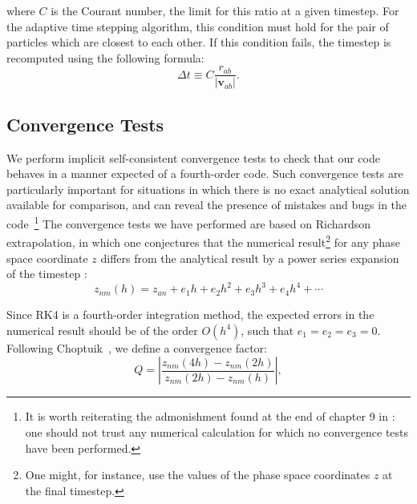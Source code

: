 \documentclass[aps,onecolumn,notitlepage,eqsecnum,nofootinbib,floatfix,superscriptaddress]{revtex4-1}
\begin{document}
\noindent where $C$ is the Courant number, the limit for this ratio at a given
timestep. For the adaptive time stepping algorithm, this condition must
hold for the pair of particles which are closest to each other. If
this condition fails, the timestep is recomputed using the following formula:
\begin{equation} \label{AdaptiveTimestepFormula}
  \Delta t \equiv C \frac{r_{ab}}{|\mathbf{v}_{ab}|}.
\end{equation}

%
%
\subsection{Convergence Tests}
\label{sec_convergence}
We perform implicit self-consistent convergence tests to check that our code behaves in a manner expected of a fourth-order code. Such convergence tests are particularly important for situations in which there is no exact analytical solution available for comparison, and can reveal the presence of mistakes and bugs in the code~\cite{BaumgarteShapiro}\footnote{It is worth reiterating the admonishment found at the end of chapter 9 in \cite{Alcubierre}: one should not trust any numerical calculation for which no convergence tests have been performed.} The convergence tests we have performed are based on Richardson extrapolation, in which one conjectures that the numerical result\footnote{One might, for instance, use the values of the phase space coordinates $z$ at the final timestep.} for any phase space coordinate $z$ differs from the analytical result by a power series expansion of the timestep \cite{Richardson1910,Alcubierre,BaumgarteShapiro,Choptuik}:
\begin{equation} \label{eqn:16}
  z_{nm}(h)= z_{an}+ e_{1}h+ e_{2}h^{2}+ e_{3}h^{3}+ e_{4}h^{4}+\cdots 
\end{equation}

\noindent Since RK4 is a fourth-order integration method, the expected errors in the numerical result should be of the order $O(h^{4})$, such that
$e_{1}= e_{2}= e_{3}= 0$. Following Choptuik~\cite{Choptuik}, we define a convergence factor:
\begin{equation} \label{eqn:17}
  Q= \left|\frac{z_{nm}(4h)- z_{nm}(2h)}{z_{nm}(2h)- z_{nm}(h)}\right|,
\end{equation}
\end{document}
